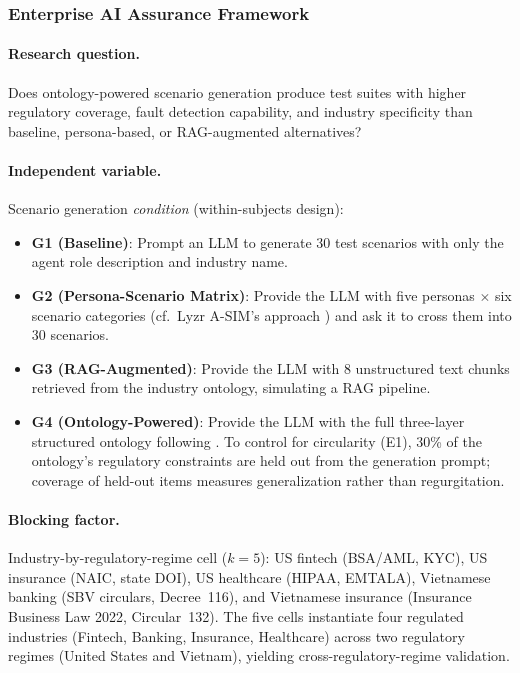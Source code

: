 \documentclass[11pt,a4paper]{article}
\begin{document}
\subsubsection{Enterprise AI Assurance Framework}

\paragraph{Research question.}
Does ontology-powered scenario generation produce test suites with
higher regulatory coverage, fault detection capability, and industry
specificity than baseline, persona-based, or RAG-augmented
alternatives?

\paragraph{Independent variable.}
Scenario generation \emph{condition} (within-subjects design):
\begin{itemize}
  \item \textbf{G1 (Baseline)}: Prompt an LLM to generate 30 test
    scenarios with only the agent role description and industry name.
  \item \textbf{G2 (Persona-Scenario Matrix)}: Provide the LLM with
    five personas $\times$ six scenario categories (cf.~Lyzr A-SIM's
    approach \citep{lyzr2026}) and ask it to cross them into 30 scenarios.
  \item \textbf{G3 (RAG-Augmented)}: Provide the LLM with 8 unstructured
    text chunks retrieved from the industry ontology, simulating a
    RAG pipeline.
  \item \textbf{G4 (Ontology-Powered)}: Provide the LLM with the full
    three-layer structured ontology following
    . To control for circularity (E1),
    30\% of the ontology's regulatory constraints are held out from
    the generation prompt; coverage of held-out items measures
    generalization rather than regurgitation.
\end{itemize}

\paragraph{Blocking factor.}
Industry-by-regulatory-regime cell ($k=5$): US fintech (BSA/AML, KYC),
US insurance (NAIC, state DOI), US healthcare (HIPAA, EMTALA),
Vietnamese banking (SBV circulars, Decree~116), and Vietnamese
insurance (Insurance Business Law 2022, Circular~132). The five cells
instantiate four regulated industries (Fintech, Banking, Insurance,
Healthcare) across two regulatory regimes (United States and Vietnam),
yielding cross-regulatory-regime validation.
\end{document}
